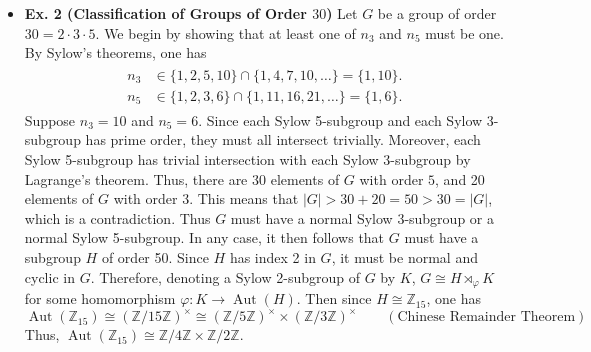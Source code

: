 \documentclass{article}
\begin{document}
\begin{itemize}
		\item \textbf{Ex. 2 (Classification of Groups of Order $30$)} Let $G$ be a group of order $30= 2 \cdot 3 \cdot 5$. We begin by showing that at least one of $n_{3}$ and $n_{5}$ must be one. By Sylow's theorems, one has 
		\begin{align*}
			\begin{split}
				n_{3} &\in \{1, 2, 5, 10\} \cap \{1, 4, 7, 10, \ldots\} = \{1, 10\}. \\
				n_{5} &\in \{1, 2, 3, 6\} \cap \{1, 11, 16, 21, \ldots\} = \{1, 6\}. 
			\end{split}
		\end{align*}
		Suppose $n_{3} = 10$ and $n_{5} = 6$. Since each Sylow 5-subgroup and each Sylow 3-subgroup has prime order, they must all intersect trivially. Moreover, each Sylow 5-subgroup has trivial intersection with each Sylow 3-subgroup by Lagrange's theorem. Thus, there are 30 elements of $G$ with order $5$, and 20 elements of $G$ with order $3$. This means that $|G| > 30 + 20 = 50 > 30 = |G|$, which is a contradiction. Thus $G$ must have a normal Sylow 3-subgroup or a normal Sylow 5-subgroup. In any case, it then follows that $G$ must have a subgroup $H$ of order 50. Since $H$ has index 2 in $G$, it must be normal and cyclic in $G$. Therefore, denoting a Sylow 2-subgroup of $G$ by $K$, $G \cong H \rtimes_{\varphi} K$ for some homomorphism $\varphi: K \to \operatorname{Aut}(H)$. Then since $H \cong \mathbb{Z}_{15}$, one has
		\begin{equation*}
			\operatorname{Aut}(\mathbb{Z}_{15}) \cong (\mathbb{Z}/15\mathbb{Z})^{\times} \cong (\mathbb{Z}/5\mathbb{Z})^{\times} \times (\mathbb{Z}/3\mathbb{Z})^{\times} \qquad (\text{Chinese Remainder Theorem})
		\end{equation*}
		Thus, $\operatorname{Aut}(\mathbb{Z}_{15}) \cong \mathbb{Z}/4\mathbb{Z} \times \mathbb{Z}/2\mathbb{Z}$. 
	\end{itemize}
	
	\newpage 
\end{document}

